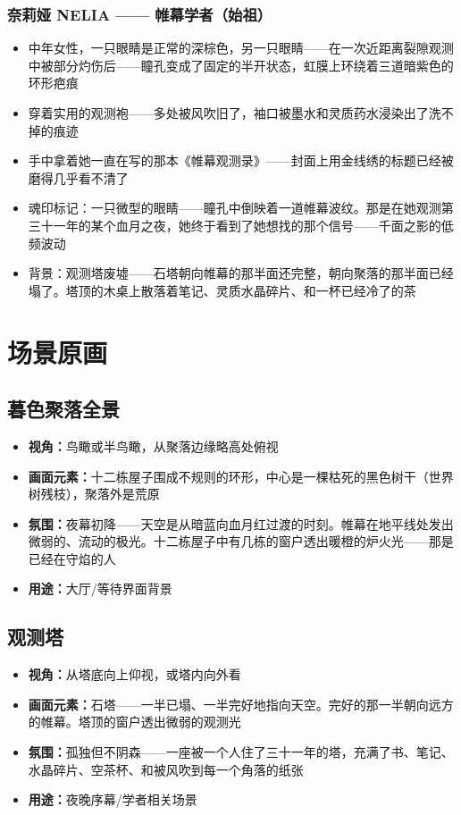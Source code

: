 \documentclass[12pt,a4paper,openany]{ctexbook}
\begin{document}
\subsection{奈莉娅 NELIA —— 帷幕学者（始祖）}
\begin{itemize}
    \item 中年女性，一只眼睛是正常的深棕色，另一只眼睛——在一次近距离裂隙观测中被部分灼伤后——瞳孔变成了固定的半开状态，虹膜上环绕着三道暗紫色的环形疤痕
    \item 穿着实用的观测袍——多处被风吹旧了，袖口被墨水和灵质药水浸染出了洗不掉的痕迹
    \item 手中拿着她一直在写的那本《帷幕观测录》——封面上用金线绣的标题已经被磨得几乎看不清了
    \item 魂印标记：一只微型的眼睛——瞳孔中倒映着一道帷幕波纹。那是在她观测第三十一年的某个血月之夜，她终于看到了她想找的那个信号——千面之影的低频波动
    \item 背景：观测塔废墟——石塔朝向帷幕的那半面还完整，朝向聚落的那半面已经塌了。塔顶的木桌上散落着笔记、灵质水晶碎片、和一杯已经冷了的茶
\end{itemize}

\chapter{场景原画}

\section{暮色聚落全景}
\begin{itemize}
    \item \textbf{视角：}鸟瞰或半鸟瞰，从聚落边缘略高处俯视
    \item \textbf{画面元素：}十二栋屋子围成不规则的环形，中心是一棵枯死的黑色树干（世界树残枝），聚落外是荒原
    \item \textbf{氛围：}夜幕初降——天空是从暗蓝向血月红过渡的时刻。帷幕在地平线处发出微弱的、流动的极光。十二栋屋子中有几栋的窗户透出暖橙的炉火光——那是已经在守焰的人
    \item \textbf{用途：}大厅/等待界面背景
\end{itemize}

\section{观测塔}
\begin{itemize}
    \item \textbf{视角：}从塔底向上仰视，或塔内向外看
    \item \textbf{画面元素：}石塔——一半已塌、一半完好地指向天空。完好的那一半朝向远方的帷幕。塔顶的窗户透出微弱的观测光
    \item \textbf{氛围：}孤独但不阴森——一座被一个人住了三十一年的塔，充满了书、笔记、水晶碎片、空茶杯、和被风吹到每一个角落的纸张
    \item \textbf{用途：}夜晚序幕/学者相关场景
\end{itemize}
\end{document}
